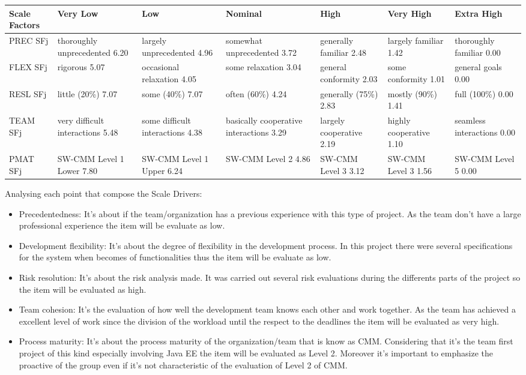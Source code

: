 \documentclass[a4paper]{article}
\begin{document}
\begin{tabular}{ | L{1.5cm} | L{3cm} | L{3cm} | L{3cm} | L{3cm} | L{3cm} | L{3cm} |}

\hline
	\textbf {Scale Factors} & \textbf {Very Low} & \textbf {Low} & \textbf {Nominal} & \textbf {High} & \textbf {Very High} & \textbf {Extra High} \\ \hline
	PREC  SFj  & thoroughly unprecedented 6.20 & largely unprecedented 4.96 & somewhat unprecedented 3.72 & generally familiar 2.48 & largely familiar 1.42& thoroughly familiar 0.00  \\ \hline
	FLEX SFj  &rigorous 5.07 &occasional relaxation 4.05 &some relaxation 3.04 &general conformity 2.03 & some conformity 1.01& general goals 0.00  \\ \hline
	RESL SFj  &little (20\%) 7.07&some (40\%) 7.07 & often (60\%) 4.24& generally (75\%) 2.83&mostly
(90\%) 1.41&full (100\%) 0.00\\ \hline
	TEAM SFj  &very difficult interactions 5.48 &some difficult interactions 4.38 &basically cooperative interactions 3.29 & largely cooperative 2.19 & highly cooperative 1.10& seamless interactions 0.00  \\ \hline
	PMAT SFj  &SW-CMM Level 1 Lower 7.80&SW-CMM Level 1 Upper 6.24&SW-CMM Level 2 4.86&SW-CMM Level 3 3.12&SW-CMM Level 3  1.56&SW-CMM Level 5  0.00\\ \hline
\end{tabular}
\newpage
Analysing each point that compose the Scale Drivers:
\begin{itemize}
\item Precedentedness: It's about if the team/organization has a previous experience with this type of project. As the team don't have a large professional experience the item will be evaluate as low.
\item Development flexibility: It's about the degree of flexibility in the development process. In this project there were several specifications for the system when becomes of functionalities thus the item will be evaluate as low.
\item Risk resolution: It's about the risk analysis made. It was carried out several risk evaluations during the differents parts of the project so the item will be evaluated as high.
\item Team cohesion: It's the evaluation of how well the development team knows each other and work together. As the team has achieved a excellent level of work since the division of the workload until the respect to the deadlines the item will be evaluated as very high.
\item Process maturity: It's about the process maturity of the organization/team that is know as CMM. Considering that it's the team first project of this kind especially involving Java EE the item will be evaluated as Level 2. Moreover it's important to emphasize the proactive of the group even if it's not characteristic of the evaluation of Level 2 of CMM. 
\end{itemize}
	
\end{document}
